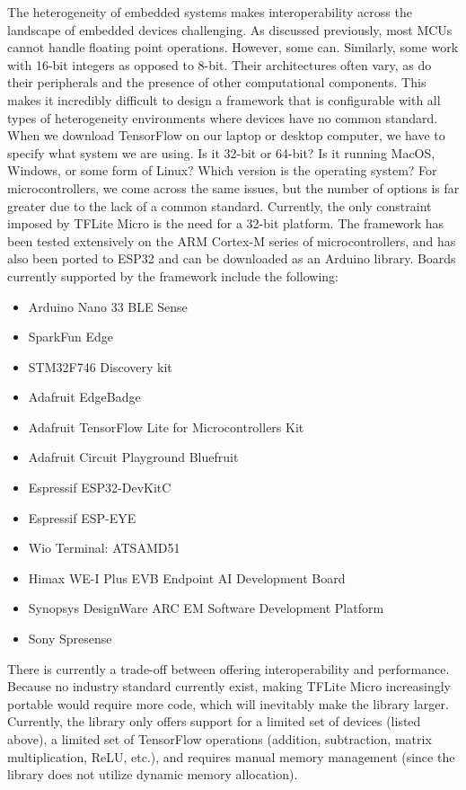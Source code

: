 {{{{{The heterogeneity of embedded systems makes interoperability across the landscape of embedded devices challenging. As discussed previously, most MCUs cannot handle floating point operations. However, some can. Similarly, some work with 16-bit integers as opposed to 8-bit. Their architectures often vary, as do their peripherals and the presence of other computational components. This makes it incredibly difficult to design a framework that is configurable with all types of heterogeneity environments where devices have no common standard. When we download TensorFlow on our laptop or desktop computer, we have to specify what system we are using. Is it 32-bit or 64-bit? Is it running MacOS, Windows, or some form of Linux? Which version is the operating system? For microcontrollers, we come across the same issues, but the number of options is far greater due to the lack of a common standard. Currently, the only constraint imposed by TFLite Micro is the need for a 32-bit platform. The framework has been tested extensively on the ARM Cortex-M series of microcontrollers, and has also been ported to ESP32 and can be downloaded as an Arduino library. Boards currently supported by the framework include the following: 

\begin{itemize}
  \item Arduino Nano 33 BLE Sense
  \item SparkFun Edge
  \item STM32F746 Discovery kit
  \item Adafruit EdgeBadge
  \item Adafruit TensorFlow Lite for Microcontrollers Kit
  \item Adafruit Circuit Playground Bluefruit
  \item Espressif ESP32-DevKitC
  \item Espressif ESP-EYE
  \item Wio Terminal: ATSAMD51
  \item Himax WE-I Plus EVB Endpoint AI Development Board
  \item Synopsys DesignWare ARC EM Software Development Platform
  \item Sony Spresense
\end{itemize}


\bigskip
There is currently a trade-off between offering interoperability and performance. Because no industry standard currently exist, making TFLite Micro increasingly portable would require more code, which will inevitably make the library larger. Currently, the library only offers support for a limited set of devices (listed above), a limited set of TensorFlow operations (addition, subtraction, matrix multiplication, ReLU, etc.), and requires manual memory management (since the library does not utilize dynamic memory allocation).

}}}}}
